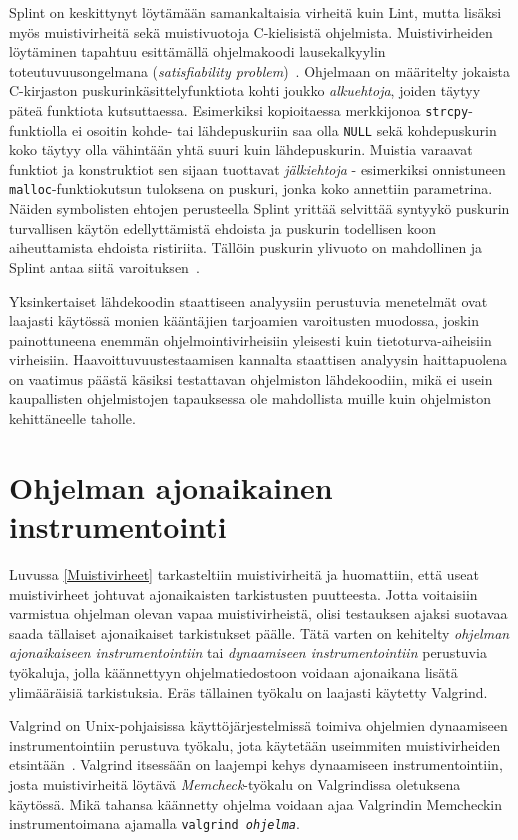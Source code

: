 Splint on keskittynyt löytämään samankaltaisia virheitä kuin Lint,
mutta lisäksi myös muistivirheitä sekä muistivuotoja C-kielisistä ohjelmista.
Muistivirheiden löytäminen tapahtuu esittämällä ohjelmakoodi lausekalkyylin toteutuvuusongelmana
(\emph{satisfiability problem})~\cite{SplintLCLint}.
Ohjelmaan on määritelty jokaista C-kirjaston puskurinkäsittelyfunktiota kohti joukko
\emph{alkuehtoja}, joiden täytyy päteä funktiota kutsuttaessa.
Esimerkiksi kopioitaessa merkkijonoa \texttt{strcpy}-funktiolla ei osoitin kohde- tai lähdepuskuriin
saa olla \texttt{NULL} sekä kohdepuskurin koko täytyy olla vähintään yhtä suuri kuin lähdepuskurin.
Muistia varaavat funktiot ja konstruktiot sen sijaan tuottavat \emph{jälkiehtoja} -
esimerkiksi onnistuneen \texttt{malloc}-funktiokutsun tuloksena on puskuri,
jonka koko annettiin parametrina.
Näiden symbolisten ehtojen perusteella Splint yrittää selvittää syntyykö
puskurin turvallisen käytön edellyttämistä ehdoista ja
puskurin todellisen koon aiheuttamista ehdoista ristiriita.
Tällöin puskurin ylivuoto on mahdollinen ja Splint antaa siitä varoituksen~\cite{SplintLCLint}.

Yksinkertaiset lähdekoodin staattiseen analyysiin perustuvia menetelmät ovat laajasti käytössä monien kääntäjien tarjoamien varoitusten muodossa,
joskin painottuneena enemmän ohjelmointivirheisiin yleisesti kuin tietoturva-aiheisiin virheisiin.
Haavoittuvuustestaamisen kannalta staattisen analyysin haittapuolena on vaatimus päästä käsiksi testattavan ohjelmiston lähdekoodiin,
mikä ei usein kaupallisten ohjelmistojen tapauksessa ole mahdollista muille kuin ohjelmiston kehittäneelle taholle.

\section{Ohjelman ajonaikainen instrumentointi}
\label{DynaaminenInstrumentointi}
Luvussa \ref{Muistivirheet} tarkasteltiin muistivirheitä ja huomattiin,
että useat muistivirheet johtuvat ajonaikaisten tarkistusten puutteesta.
Jotta voitaisiin varmistua ohjelman olevan vapaa muistivirheistä,
olisi testauksen ajaksi suotavaa saada tällaiset ajonaikaiset tarkistukset päälle.
Tätä varten on kehitelty \emph{ohjelman ajonaikaiseen instrumentointiin} tai \emph{dynaamiseen instrumentointiin} perustuvia työkaluja,
jolla käännettyyn ohjelmatiedostoon voidaan ajonaikana lisätä ylimääräisiä tarkistuksia.
Eräs tällainen työkalu on laajasti käytetty Valgrind.

Valgrind on Unix-pohjaisissa käyttöjärjestelmissä toimiva ohjelmien dynaamiseen instrumentointiin
perustuva työkalu, jota käytetään useimmiten muistivirheiden etsintään~\cite{Valgrind}.
Valgrind itsessään on laajempi kehys dynaamiseen instrumentointiin,
josta muistivirheitä löytävä \emph{Memcheck}-työkalu on Valgrindissa oletuksena käytössä.
Mikä tahansa käännetty ohjelma voidaan ajaa Valgrindin Memcheckin instrumentoimana ajamalla
\texttt{valgrind \emph{ohjelma}}.


